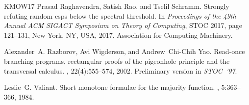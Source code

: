 \documentclass[10pt,a4paper]{article}
\theoremstyle{plain}
\theoremstyle{remark}
\theoremstyle{definition}
\begin{document}
\begin{thebibliography}{KMOW17}
Prasad Raghavendra, Satish Rao, and Tselil Schramm.
\newblock Strongly refuting random csps below the spectral threshold.
\newblock In {\em Proceedings of the 49th Annual ACM SIGACT Symposium on Theory
  of Computing}, STOC 2017, page 121–131, New York, NY, USA, 2017.
  Association for Computing Machinery.

Alexander~A. Razborov, Avi Wigderson, and Andrew~Chi{-}Chih Yao.
\newblock Read-once branching programs, rectangular proofs of the pigeonhole
  principle and the transversal calculus.
, 22(4):555--574, 2002.
\newblock Preliminary version in \emph{STOC~'97}.

Leslie~G. Valiant.
\newblock Short monotone formulae for the majority function.
, 5:363--366, 1984.

\end{thebibliography}
\end{document}
